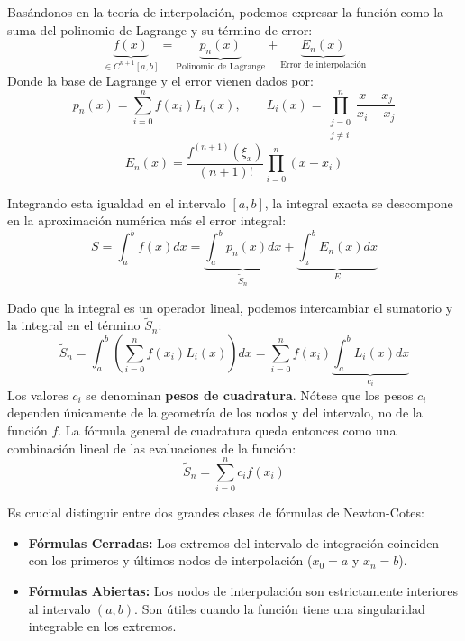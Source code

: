 Basándonos en la teoría de interpolación, podemos expresar la función como la suma del polinomio de Lagrange y su término de error:
\[
    \underbrace{f(x)}_{\in C^{n+1}[a,b]} = 
    \underbrace{p_n(x)}_{\text{Polinomio de Lagrange}} + \underbrace{E_n(x)}_{\text{Error de interpolación}}
\]
Donde la base de Lagrange y el error vienen dados por:
\[
    p_n(x) = \sum_{i=0}^n f(x_i) L_i(x), \qquad L_i(x) = \prod_{\substack{j=0 \\ j \neq i}}^n \frac{x - x_j}{x_i - x_j}
\]
\[
    E_n(x) = \frac{f^{(n+1)}(\xi_x)}{(n+1)!} \prod_{i=0}^n (x - x_i)
\]

Integrando esta igualdad en el intervalo $[a,b]$, la integral exacta se descompone en la aproximación numérica más el error integral:
\[
    S = \int_a^b f(x) dx = 
    \underbrace{\int_a^b p_n(x) dx}_{\widetilde{S}_n} + \underbrace{\int_a^b E_n(x) dx}_{E}
\]

Dado que la integral es un operador lineal, podemos intercambiar el sumatorio y la integral en el término $\widetilde{S}_n$:
\[
    \widetilde{S}_n = \int_a^b \left( \sum_{i=0}^n f(x_i) L_i(x) \right) dx = \sum_{i=0}^n f(x_i) \underbrace{\int_a^b L_i(x) dx}_{c_i}
\]
Los valores $c_i$ se denominan \textbf{pesos de cuadratura}. Nótese que los pesos $c_i$ dependen únicamente de la geometría de los nodos y del intervalo, no de la función $f$. La fórmula general de cuadratura queda entonces como una combinación lineal de las evaluaciones de la función:
\[
    \boxed{\widetilde{S}_n = \sum_{i=0}^n c_i f(x_i)}
\]

Es crucial distinguir entre dos grandes clases de fórmulas de Newton-Cotes:
\begin{itemize}
    \item \textbf{Fórmulas Cerradas:} Los extremos del intervalo de integración coinciden con los primeros y últimos nodos de interpolación ($x_0 = a$ y $x_n = b$).
    \item \textbf{Fórmulas Abiertas:} Los nodos de interpolación son estrictamente interiores al intervalo $(a, b)$. Son útiles cuando la función tiene una singularidad integrable en los extremos.
\end{itemize}

